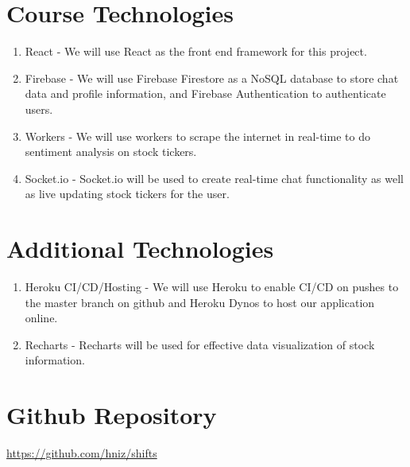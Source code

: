 \documentclass[preprint,11pt,3p]{article}
\begin{document}
\section{Course Technologies}
\begin{enumerate} 
	\item React - We will use React as the front end framework for this project.
	\item Firebase - We will use Firebase Firestore as a NoSQL database to store chat data and profile information, and Firebase Authentication to authenticate users.
	\item Workers - We will use workers to scrape the internet in real-time to do sentiment analysis on stock tickers.
	\item Socket.io - Socket.io will be used to create real-time chat functionality as well as live updating stock tickers for the user.
\end{enumerate} 

\newpage
\section{Additional Technologies}
\begin{enumerate}
	\item Heroku CI/CD/Hosting - We will use Heroku to enable CI/CD on pushes to the master branch on github and Heroku Dynos to host our application online.
	\item Recharts - Recharts will be used for effective data visualization of stock information.
\end{enumerate}	


\section{Github Repository}
\href{https://github.com/hniz/shifts}{https://github.com/hniz/shifts }
\end{document}
